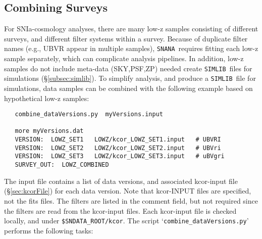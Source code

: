 \documentclass[12pt]{article}
\newcommand{\snana}{{\tt SNANA}}
\newcommand{\sndataroot}{{\tt SNDATA\_ROOT}}
\newcommand{\simlib}{{\tt SIMLIB}}
\begin{document}
\clearpage
\subsection{Combining Surveys}
\label{subsec:combine_dataVerions}

For SNIa-cosmology analyses, there are many low-z samples
consisting of different surveys, and different filter systems 
within a survey. Because of duplicate filter names 
(e.g., UBVR appear in multiple samples), \snana\ requires 
fitting each low-z sample separately, which can complicate 
analysis pipelines. In addition, low-z samples do not include
meta-data (SKY,PSF,ZP) needed create \simlib\ files for simulations
(\S\ref{subsec:simlib}).
%
To simplify analysis, and produce a \simlib\ file for simulations,
data samples can be combined with the following example based
on hypothetical low-z samples:
\begin{verbatim}
   combine_dataVersions.py  myVersions.input
 
   more myVersions.dat
   VERSION:  LOWZ_SET1   LOWZ/kcor_LOWZ_SET1.input   # UBVRI  
   VERSION:  LOWZ_SET2   LOWZ/kcor_LOWZ_SET2.input   # UBVri  
   VERSION:  LOWZ_SET3   LOWZ/kcor_LOWZ_SET3.input   # uBVgri
   SURVEY_OUT:  LOWZ_COMBINED
\end{verbatim}
%
The input file contains a list of data versions, and associated kcor-input
file (\S\ref{sec:kcorFile}) for each data version. 
Note that kcor-INPUT files are specified, not the fits files.
The filters are listed in the comment field, 
but not required since the filters are read
from the kcor-input files.
Each kcor-input file is checked locally, 
and under {\tt \$\sndataroot\//kcor}.
The script `{\tt combine\_dataVersions.py}' performs the following tasks:
%
\end{document}
